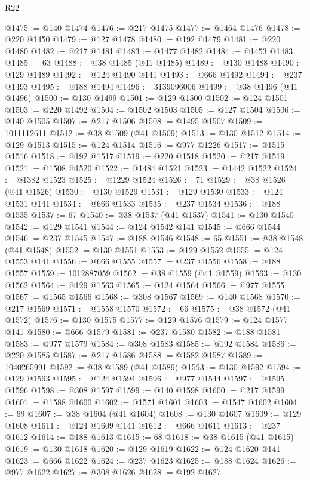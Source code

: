\begin{lexlean}{R22}
\begin{coremodule}
@1475 := @140 @1474
@1476 := @217 @1475
@1477 := @1464 @1476
@1478 := @220 @1450
@1479 := @127 @1478
@1480 := @192 @1479
@1481 := @220 @1480
@1482 := @217 @1481
@1483 := @1477 @1482
@1484 := @1453 @1483
@1485 := 63
@1488 := @38 @1485 (@41 @1485)
@1489 := @130 @1488
@1490 := @129 @1489
@1492 := @124 @1490 @141
@1493 := @666 @1492
@1494 := @237 @1493
@1495 := @188 @1494
@1496 := 3139096006
@1499 := @38 @1496 (@41 @1496)
@1500 := @130 @1499
@1501 := @129 @1500
@1502 := @124 @1501
@1503 := @220 @1492
@1504 := @1502 @1503
@1505 := @127 @1504
@1506 := @140 @1505
@1507 := @217 @1506
@1508 := @1495 @1507
@1509 := 1011112611
@1512 := @38 @1509 (@41 @1509)
@1513 := @130 @1512
@1514 := @129 @1513
@1515 := @124 @1514
@1516 := @977 @1226
@1517 := @1515 @1516
@1518 := @192 @1517
@1519 := @220 @1518
@1520 := @217 @1519
@1521 := @1508 @1520
@1522 := @1484 @1521
@1523 := @1442 @1522
@1524 := @1382 @1523
@1525 := @1229 @1524
@1526 := 71
@1529 := @38 @1526 (@41 @1526)
@1530 := @130 @1529
@1531 := @129 @1530
@1533 := @124 @1531 @141
@1534 := @666 @1533
@1535 := @237 @1534
@1536 := @188 @1535
@1537 := 67
@1540 := @38 @1537 (@41 @1537)
@1541 := @130 @1540
@1542 := @129 @1541
@1544 := @124 @1542 @141
@1545 := @666 @1544
@1546 := @237 @1545
@1547 := @188 @1546
@1548 := 65
@1551 := @38 @1548 (@41 @1548)
@1552 := @130 @1551
@1553 := @129 @1552
@1555 := @124 @1553 @141
@1556 := @666 @1555
@1557 := @237 @1556
@1558 := @188 @1557
@1559 := 1012887059
@1562 := @38 @1559 (@41 @1559)
@1563 := @130 @1562
@1564 := @129 @1563
@1565 := @124 @1564
@1566 := @977 @1555
@1567 := @1565 @1566
@1568 := @308 @1567
@1569 := @140 @1568
@1570 := @217 @1569
@1571 := @1558 @1570
@1572 := 66
@1575 := @38 @1572 (@41 @1572)
@1576 := @130 @1575
@1577 := @129 @1576
@1579 := @124 @1577 @141
@1580 := @666 @1579
@1581 := @237 @1580
@1582 := @188 @1581
@1583 := @977 @1579
@1584 := @308 @1583
@1585 := @192 @1584
@1586 := @220 @1585
@1587 := @217 @1586
@1588 := @1582 @1587
@1589 := 1040265991
@1592 := @38 @1589 (@41 @1589)
@1593 := @130 @1592
@1594 := @129 @1593
@1595 := @124 @1594
@1596 := @977 @1544
@1597 := @1595 @1596
@1598 := @308 @1597
@1599 := @140 @1598
@1600 := @217 @1599
@1601 := @1588 @1600
@1602 := @1571 @1601
@1603 := @1547 @1602
@1604 := 69
@1607 := @38 @1604 (@41 @1604)
@1608 := @130 @1607
@1609 := @129 @1608
@1611 := @124 @1609 @141
@1612 := @666 @1611
@1613 := @237 @1612
@1614 := @188 @1613
@1615 := 68
@1618 := @38 @1615 (@41 @1615)
@1619 := @130 @1618
@1620 := @129 @1619
@1622 := @124 @1620 @141
@1623 := @666 @1622
@1624 := @237 @1623
@1625 := @188 @1624
@1626 := @977 @1622
@1627 := @308 @1626
@1628 := @192 @1627

\end{coremodule}
\end{lexlean}
